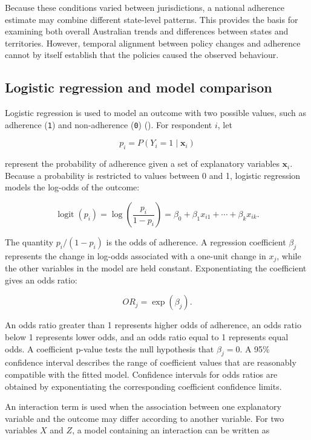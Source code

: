 \documentclass[
  12pt,
  a4paper,
]{article}
\begin{document}
Because these conditions varied between jurisdictions, a national
adherence estimate may combine different state-level patterns. This
provides the basis for examining both overall Australian trends and
differences between states and territories. However, temporal alignment
between policy changes and adherence cannot by itself establish that the
policies caused the observed behaviour.

\subsection{Logistic regression and model comparison}\label{logistic-regression-and-model-comparison}

Logistic regression is used to model an outcome with two possible
values, such as adherence (\texttt{1}) and non-adherence (\texttt{0}) ().
For respondent \(i\), let

\[
p_i = P(Y_i = 1 \mid \mathbf{x}_i)
\]

represent the probability of adherence given a set of explanatory
variables \(\mathbf{x}_i\). Because a probability is restricted to values
between 0 and 1, logistic regression models the log-odds of the outcome:

\[
\operatorname{logit}(p_i)
=
\log\left(\frac{p_i}{1-p_i}\right)
=
\beta_0
+
\beta_1x_{i1}
+
\cdots
+
\beta_kx_{ik}.
\]

The quantity \(p_i/(1-p_i)\) is the odds of adherence. A regression
coefficient \(\beta_j\) represents the change in log-odds associated with
a one-unit change in \(x_j\), while the other variables in the model are
held constant. Exponentiating the coefficient gives an odds ratio:

\[
OR_j = \exp(\beta_j).
\]

An odds ratio greater than 1 represents higher odds of adherence, an
odds ratio below 1 represents lower odds, and an odds ratio equal to 1
represents equal odds. A coefficient p-value tests the null hypothesis
that \(\beta_j = 0\). A 95\% confidence interval describes the range of
coefficient values that are reasonably compatible with the fitted model.
Confidence intervals for odds ratios are obtained by exponentiating the
corresponding coefficient confidence limits.

An interaction term is used when the association between one explanatory
variable and the outcome may differ according to another variable. For
two variables \(X\) and \(Z\), a model containing an interaction can be
written as
\end{document}
